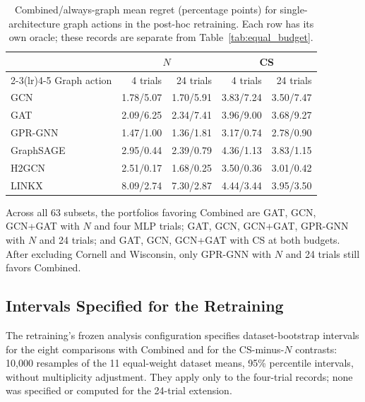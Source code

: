 \begin{table}[tbp]
\centering
\caption{Combined/always-graph mean regret (percentage points) for single-architecture graph actions in the post-hoc retraining. Each row has its own oracle; these records are separate from Table~\ref{tab:equal_budget}.}
\label{tab:mlp_budget_single}
\small
\begin{tabular}{@{}lrrrr@{}}
\toprule
 & \multicolumn{2}{c}{$N$} & \multicolumn{2}{c}{CS} \\
\cmidrule(lr){2-3}\cmidrule(lr){4-5}
Graph action & 4 trials & 24 trials & 4 trials & 24 trials \\
\midrule
GCN & 1.78/5.07 & 1.70/5.91 & 3.83/7.24 & 3.50/7.47 \\
GAT & 2.09/6.25 & 2.34/7.41 & 3.96/9.00 & 3.68/9.27 \\
GPR-GNN & 1.47/1.00 & 1.36/1.81 & 3.17/0.74 & 2.78/0.90 \\
GraphSAGE & 2.95/0.44 & 2.39/0.79 & 4.36/1.13 & 3.83/1.15 \\
H2GCN & 2.51/0.17 & 1.68/0.25 & 3.50/0.36 & 3.01/0.42 \\
LINKX & 8.09/2.74 & 7.30/2.87 & 4.44/3.44 & 3.95/3.50 \\
\bottomrule
\end{tabular}
\end{table}

Across all 63 subsets, the portfolios favoring Combined are GAT, GCN, GCN+GAT with $N$ and four MLP trials; GAT, GCN, GCN+GAT, GPR-GNN with $N$ and 24 trials; and GAT, GCN, GCN+GAT with CS at both budgets. After excluding Cornell and Wisconsin, only GPR-GNN with $N$ and 24 trials still favors Combined.

\subsection{Intervals Specified for the Retraining}

The retraining's frozen analysis configuration specifies dataset-bootstrap intervals for the eight comparisons with Combined and for the CS-minus-$N$ contrasts: 10,000 resamples of the 11 equal-weight dataset means, 95\% percentile intervals, without multiplicity adjustment. They apply only to the four-trial records; none was specified or computed for the 24-trial extension.

